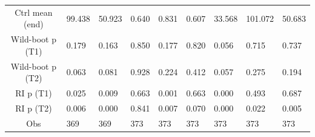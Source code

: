 {\begin{tabular}{@{}S*{8}{P}@{}}
Ctrl mean (end)     &      99.438         &      50.923         &       0.640         &       0.831         &       0.607         &      33.568         &     101.072         &      50.683         \\
Wild-boot p (T1)    &       0.179         &       0.163         &       0.850         &       0.177         &       0.820         &       0.056         &       0.715         &       0.737         \\
Wild-boot p (T2)    &       0.063         &       0.081         &       0.928         &       0.224         &       0.412         &       0.057         &       0.275         &       0.194         \\
RI p (T1)           &       0.025         &       0.009         &       0.663         &       0.001         &       0.663         &       0.000         &       0.493         &       0.687         \\
RI p (T2)           &       0.006         &       0.000         &       0.841         &       0.007         &       0.070         &       0.000         &       0.022         &       0.005         \\
Obs                 &         369         &         369         &         373         &         373         &         373         &         373         &         373         &         373         \\
\bottomrule
\end{tabular}
}
